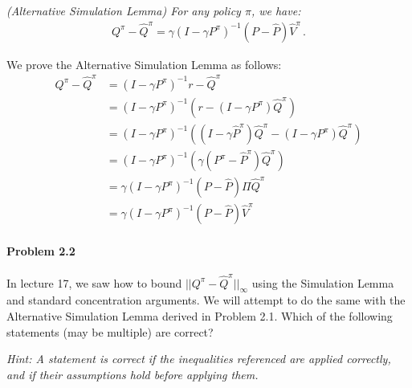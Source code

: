\emph{
(Alternative Simulation Lemma) For any policy $\pi$, we have:}
\begin{align*}
   Q^\pi - \widehat{Q}^\pi = \gamma(I - \gamma P^\pi)^{-1} (P - \widehat{P}) \widehat{V}^\pi\,. 
\end{align*}

\begin{sol}
    We prove the Alternative Simulation Lemma as follows:
    \begin{align*}
        Q^\pi - \hat{Q}^\pi &= (I - \gamma P^\pi)^{-1} r - \hat{Q}^\pi \\
        &= (I - \gamma P^\pi)^{-1} \left(r - (I - \gamma P^\pi) \hat{Q}^\pi\right) \\
        &= (I - \gamma P^\pi)^{-1} \left((I - \gamma \hat{P}^\pi)\hat{Q}^\pi - (I - \gamma P^\pi) \hat{Q}^\pi\right) \\
        &= (I - \gamma P^\pi)^{-1} \left( \gamma(P^\pi - \hat{P}^\pi) \hat{Q}^\pi\right) \\
        &= \gamma(I - \gamma P^\pi)^{-1} (P - \hat{P}) \Pi \hat{Q}^\pi \\
        &= \gamma(I - \gamma P^\pi)^{-1} (P - \hat{P}) \hat{V}^\pi
    \end{align*}
\end{sol}


\newpage\paragraph{Problem 2.2} 
In lecture 17, we saw how to bound $||Q^\pi - \widehat{Q}^\pi||_{\infty}$ using the Simulation Lemma and standard concentration arguments. We will attempt to do the same with the Alternative Simulation Lemma derived in Problem 2.1. Which of the following statements (may be multiple) are correct?

\emph{Hint: A statement is correct if the inequalities referenced are applied correctly, and if their assumptions hold before applying them.}

